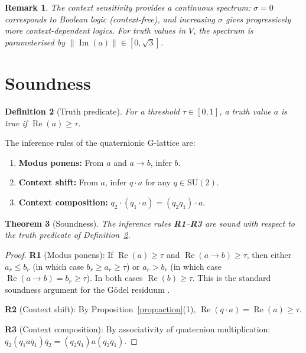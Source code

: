 \documentclass[11pt,a4paper]{article}
\newtheorem{theorem}{Theorem}
\newtheorem{definition}[theorem]{Definition}
\newtheorem{remark}[theorem]{Remark}
\newcommand{\Real}{\operatorname{Re}}
\newcommand{\Imag}{\operatorname{Im}}
\newcommand{\SU}{\mathrm{SU}(2)}
\begin{document}
\begin{remark}
The context sensitivity provides a continuous spectrum:
$\sigma=0$ corresponds to Boolean logic (context-free),
and increasing $\sigma$ gives progressively more
context-dependent logics. For truth values in $V$, the spectrum
is parameterised by $\|\Imag(a)\|\in[0,\sqrt{3}]$.
\end{remark}

\section{Soundness}
\label{sec:soundness}

\begin{definition}[Truth predicate]
\label{def:true}
For a threshold $\tau\in[0,1]$, a truth value $a$ is \emph{true}
if $\Real(a)\geq\tau$.
\end{definition}

The inference rules of the quaternionic G-lattice are:

\begin{enumerate}[nosep,label=\textbf{R\arabic*}.]
\item \textbf{Modus ponens:} From $a$ and $a\to b$, infer $b$.
\item \textbf{Context shift:} From $a$, infer $q\cdot a$ for any $q\in\SU$.
\item \textbf{Context composition:} $q_2\cdot(q_1\cdot a)=(q_2 q_1)\cdot a$.
\end{enumerate}

\begin{theorem}[Soundness]
\label{thm:soundness}
The inference rules \textbf{R1}--\textbf{R3} are sound with respect
to the truth predicate of Definition~\ref{def:true}.
\end{theorem}

\begin{proof}
\textbf{R1} (Modus ponens): If $\Real(a)\geq\tau$ and
$\Real(a\to b)\geq\tau$, then either $a_r\leq b_r$ (in which case
$b_r\geq a_r\geq\tau$) or $a_r>b_r$ (in which case
$\Real(a\to b)=b_r\geq\tau$). In both cases $\Real(b)\geq\tau$.
This is the standard soundness argument for the G\"odel residuum
\citep{hajek1998,galatos2007}.

\textbf{R2} (Context shift): By Proposition~\ref{prop:action}(1),
$\Real(q\cdot a)=\Real(a)\geq\tau$.

\textbf{R3} (Context composition): By associativity of quaternion
multiplication: $q_2(q_1 a\bar{q}_1)\bar{q}_2=(q_2 q_1)a(\overline{q_2 q_1})$.
\end{proof}
\end{document}

